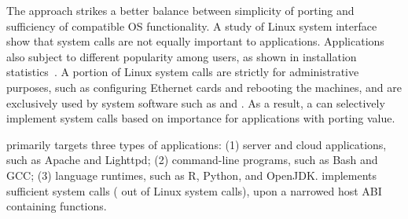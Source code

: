 The \libos{} approach strikes a better balance %
between simplicity of porting
and sufficiency of compatible OS functionality. %
A study of Linux system interface~\cite{tsai16apistudy}
show that system calls
are not equally important to applications.
Applications also
subject to different popularity among users, as shown in
installation statistics~\cite{ubuntu-popularity}.
A portion of Linux system calls are strictly for administrative purposes,
such as configuring Ethernet cards and rebooting the machines,
and are 
exclusively used by
system software such as  and .
As a result, a \libos{} can selectively implement
system calls
based on importance for applications
with porting value.



\graphene{} primarily targets three types of applications:
(1) server and cloud applications, such as Apache and Lighttpd;
(2) command-line programs, such as Bash and GCC;
(3) language runtimes, such as R, Python, and OpenJDK.
\graphene{}
implements sufficient system calls (\graphenesyscallnum{} out of \linuxsyscallnum{} Linux system calls),
upon a narrowed host ABI containing \palcallnum{} functions.









